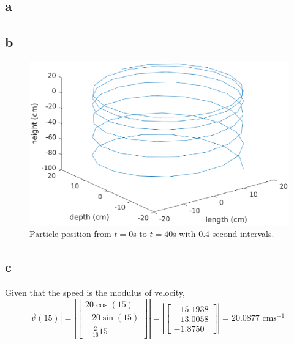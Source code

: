 \subsection{a}


\subsection{b}
\begin{figure}[h]
    \centering
    \includegraphics[scale=0.7, center]{./eps/topic3_b.eps}
    \caption{Particle position from $t=0$s to $t=40$s with 0.4 second intervals.}
    \label{fig:Topic3-b}
\end{figure}


\subsection{c}
Given that the speed is the modulus of velocity,
\begin{equation}
        \left| \overrightarrow{v}(15) \right| = \left| \begin{bmatrix}
            20\cos(15)\\ -20\sin(15) \\ -\frac{2}{16}15
        \end{bmatrix} \right|
        =
        \left| \begin{bmatrix}
        -15.1938 \\ -13.0058 \\ -1.8750
        \end{bmatrix} \right|
        =
        20.0877 \text{ cms$^{-1}$ }
\end{equation}

